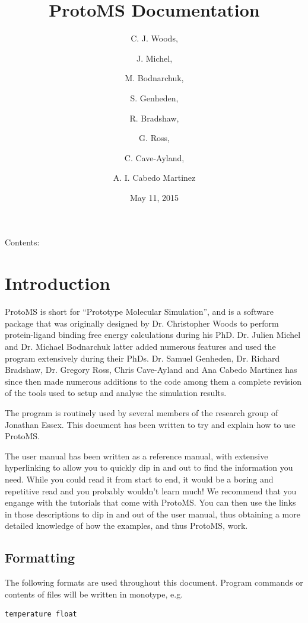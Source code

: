 \documentclass[letterpaper,10pt,english]{sphinxmanual}
\title{ProtoMS Documentation}
\date{May 11, 2015}
\author{C. J. Woods, \and J. Michel, \and M. Bodnarchuk, \and S. Genheden, \and R. Bradshaw, \and G. Ross, \and C. Cave-Ayland, \and A. I. Cabedo Martinez}
\begin{document}
\maketitle
\tableofcontents
{}\label{index::doc}


Contents:


\chapter{Introduction}
\label{introduction:introduction}\label{introduction:protoms-documentation}\label{introduction::doc}
ProtoMS is short for “Prototype Molecular Simulation”, and is a software package that was originally designed by Dr. Christopher Woods to perform protein-ligand binding free energy calculations during his PhD. Dr. Julien Michel and Dr. Michael Bodnarchuk latter added numerous features and used the program extensively during their PhDs. Dr. Samuel Genheden, Dr. Richard Bradshaw, Dr. Gregory Ross, Chris Cave-Ayland and Ana Cabedo Martinez has since then made numerous additions to the code among them a complete revision of the tools used to setup and analyse the simulation results.

The program is routinely used by several members of the research group of Jonathan Essex. This document has been written to try and explain how to use ProtoMS.

The user manual has been written as a reference manual, with extensive hyperlinking to allow you to quickly dip in and out to find the information you need. While you could read it from start to end, it would be a boring and repetitive read and you probably wouldn’t learn much! We recommend that you engange with the tutorials that come with ProtoMS. You can then use the links in those descriptions to dip in and out of the user manual, thus obtaining a more detailed knowledge of how the examples, and thus ProtoMS, work.


\section{Formatting}
\label{introduction:formatting}
The following formats are used throughout this document. Program commands or contents of files will be written in monotype, e.g.

\begin{Verbatim}[commandchars=\\\{\}]
temperature float
\end{Verbatim}
\end{document}
